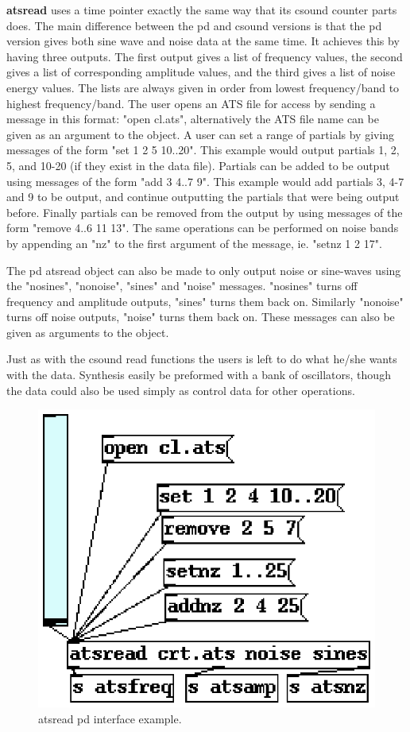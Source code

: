 \documentclass[10pt,letterpaper]{article}
\begin{document}
\textbf{atsread} uses a time pointer exactly the same way that its csound counter parts does.  The main difference between the pd and csound versions is that the pd version gives both sine wave and noise data at the same time.  It achieves this by having three outputs.  The first output gives a list of frequency values, the second gives a list of corresponding amplitude values, and the third gives a list of noise energy values.  The lists are always given in order from lowest frequency/band to highest frequency/band.  The user opens an ATS file for access by sending a message in this format: "open cl.ats", alternatively the ATS file name can be given as an argument to the object.  A user can set a range of partials by giving messages of the form "set 1 2 5 10..20".  This example would output partials 1, 2, 5, and 10-20 (if they exist in the data file).  Partials can be added to be output using messages of the form "add 3 4..7 9".  This example would add partials 3, 4-7 and 9 to be output, and continue outputting the partials that were being output before.  Finally partials can be removed from the output by using messages of the form "remove 4..6 11 13".  The same operations can be performed on noise bands by appending an "nz" to the first argument of the message, ie. "setnz 1 2 17".

The pd atsread object can also be made to only output noise or sine-waves using the "nosines", "nonoise", "sines" and "noise" messages.  "nosines" turns off frequency and amplitude outputs, "sines" turns them back on.  Similarly "nonoise" turns off noise outputs, "noise" turns them back on.  These messages can also be given as arguments to the object.

Just as with the csound read functions the users is left to do what he/she wants with the data.  Synthesis easily be preformed with a bank of oscillators, though the data could also be used simply as control data for other operations.


\begin{figure}[htb]
	\begin{center}
	\includegraphics{ats-pd-example.eps}
	\caption{atsread pd interface example.}
	\label{fig:emptybox}
	\end{center}
\end{figure}
\end{document}
